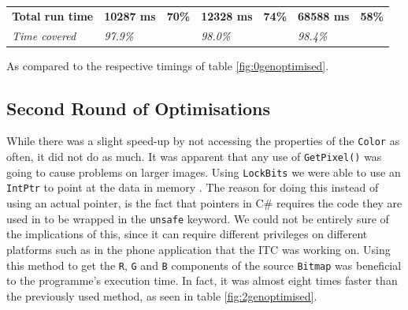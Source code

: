 \begin{table}[H]
\begin{tabular}{@{}lllllll@{}}
        \textbf{Total run time} & \textbf{10287 ms}                                                                         & \textbf{70\%}                                                                  & \textbf{12328 ms}                                                                          & \textbf{74\%}                                                                 & \textbf{68588 ms}                                                                       & \textbf{58\%}                                                                 \\
        \textit{Time covered}   & \textit{97.9\%}                                                                           & \textit{}                                                                      & \textit{98.0\%}                                                                            &                                                                               & \textit{98.4\%}                                                                         & \textit{}                                                                     \\ \bottomrule
    \end{tabular}
    \begin{tablenotes}
        \footnotesize{\item \textdagger As compared to the respective timings of table \ref{fig:0genoptimised}.}
    \end{tablenotes}
\end{table}

\subsection{Second Round of Optimisations}
While there was a slight speed-up by not accessing the properties of the \lstinline|Color| as often, it did not do as much.
It was apparent that any use of \lstinline|GetPixel()| was going to cause problems on larger images.
Using \lstinline|LockBits| we were able to use an \lstinline|IntPtr| to point at the data in memory \citep{MSDNIntPtr}.
The reason for doing this instead of using an actual pointer, is the fact that pointers in C\# requires the code they are used in to be wrapped in the \lstinline|unsafe| keyword. 
We could not be entirely sure of the implications of this, since it can require different privileges on different platforms such as in the phone application that the ITC was working on.
Using this method to get the \lstinline|R|, \lstinline|G| and \lstinline|B| components of the source \lstinline|Bitmap| was beneficial to the programme's execution time.
In fact, it was almost eight times faster than the previously used method, as seen in table \ref{fig:2genoptimised}.

